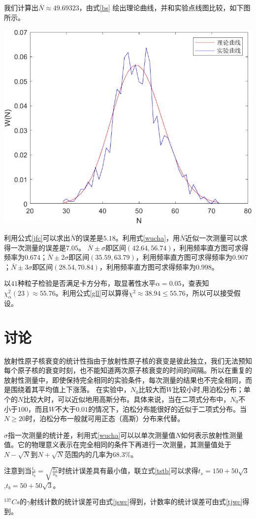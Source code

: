 \documentclass[hyperref]{ctexart}
\begin{document}
\begin{multicols}{2}
我们计算出$\overline{N}\approx 49.69323$，由式\eqref{bs} 绘出理论曲线，并和实验点线图比较，如下图所示。

\begin{center}\includegraphics[scale=0.5]{gsqx.png} \end{center}

利用公式\eqref{jfc}可以求出$\overline{N}$的误差是$5.18$。利用式\eqref{wucha}，用$\overline{N}$近似一次测量可以求得一次测量的误差是$7.05$。
$\overline{N}\pm \sigma$即区间$(42.64,56.74)$，利用频率直方图可求得频率为$0.674$；$\overline{N}\pm 2\sigma$即区间$(35.59,63.79)$，利用频率直方图可求得频率为$0.907$；$\overline{N}\pm 3\sigma$即区间$(28.54,70.84)$，利用频率直方图可求得频率为$0.998$。

以$41$种粒子检验是否满足卡方分布，取显著性水平$\alpha=0.05$，查表知$\chi^2_{\alpha}(23)\approx 55.76$。利用公式\eqref{gll}可以算得$\chi^2 \approx 38.94 \le 55.76$，所以可以接受假设。
\section{讨论}
放射性原子核衰变的统计性指由于放射性原子核的衰变是彼此独立，我们无法预知每个原子核的衰变时刻，也不能知道两次原子核衰变的时间的间隔。所以在重复的放射性测量中，即使保持完全相同的实验条件，每次测量的结果也不完全相同，而是围绕着其平均值上下涨落。
在实验中，$N_0$比较大而$W$比较小时,用泊松分布；单个的$N$比较大时，可以近似地用高斯分布。具体来说，当在二项式分布中，$N_0$不小于$100$，而且$W$不大于$0.01$的情况下，泊松分布能很好的近似于二项式分布。当$N\geq 20$时，泊松分布一般就可用正态（高斯）分布来代替。

$\sigma$指一次测量的统计差，利用式\eqref{wucha}可以以单次测量值$N$如何表示放射性测量值。它的物理意义表示在完全相同的条件下再进行一次测量，其测量值处于$N-\sqrt{N}$到$N+\sqrt{N}$范围内的几率为$68.3\%$。

注意到当$\frac{t_s}{t_b}=\sqrt{\frac{n_s}{n_b}}$时统计误差具有最小值，联立式\eqref{tstb}可以求得$t_s=150+50\sqrt{3}$
,$t_b=50+50\sqrt{3}$。

$^{137}Cs$的$\gamma$射线计数的统计误差可由式\eqref{jswc}得到，计数率的统计误差可由式\eqref{tjwc}得到。
\end{multicols}
\end{document}
